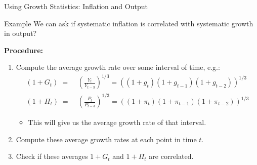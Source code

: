 \documentclass[10pt,c,aspectratio=1610,handout]{beamer}
\begin{document}
\begin{frame}{Using Growth Statistics: Inflation and Output}%
  \begin{block}{Example}%
    We can ask if systematic inflation is correlated with systematic growth in output?%
  \end{block}%
  \medskip%
  \pause%
  \textbf{Procedure:}%
  \begin{small}%
    \begin{enumerate}%
      \item Compute the average growth rate over some interval of time, e.g.:%
      \begin{align*}%
        (1+G_t) \; = & \; \left (\frac{Y_t}{Y_{t-3}} \right )^{1/3} = \left ((1+g_t) (1+g_{t-1})(1+g_{t-2}) \right )^{1/3} \\%
        (1+ \Pi_t) \; = & \; \left (\frac{P_t}{P_{t-3}} \right )^{1/3} = \left ((1+\pi_t) (1+\pi_{t-1})(1+\pi_{t-2}) \right )^{1/3}%
      \end{align*}%
      \begin{itemize}%
        \item[$\rightarrow$] This will give us the average growth rate of that interval.%
      \end{itemize}%
      \pause%
      \item Compute these average growth rates at each point in time $t$.%
      \pause%
      \item Check if these averages $1+G_t$ and $1 + \Pi_t$ are correlated.%
    \end{enumerate}%
  \end{small}%
\end{frame}%
\end{document}
